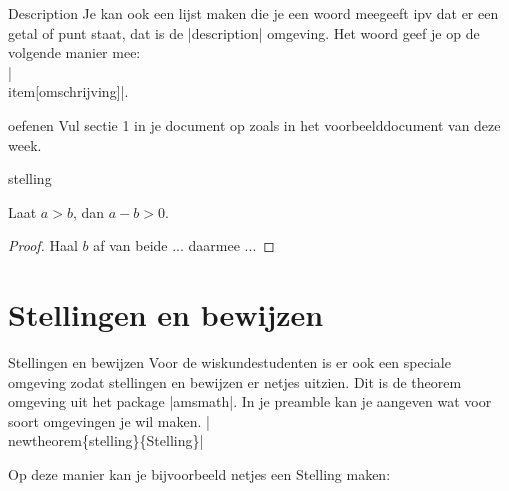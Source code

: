 \documentclass{cursuspresentatie}
\begin{document}
\begin{frame}{Description}
	Je kan ook een lijst maken die je een woord meegeeft ipv dat er een getal of
	punt staat, dat is de \hll|description| omgeving. Het woord geef je op de
	volgende manier mee:\\
	\hll|\\item[omschrijving]|.
\end{frame}

\begin{frame}{oefenen}
	Vul sectie 1 in je document op zoals in het voorbeelddocument van deze week.
\end{frame}

\begin{saveblock}{stelling}
    \begin{highlightblock}
        \begin{stelling}
            Laat $ a > b $, dan $ a - b > 0 $.
            \begin{proof}
                Haal $ b $ af van beide ...
                daarmee ...
            \end{proof}
        \end{stelling}
    \end{highlightblock}
\end{saveblock}

\section{Stellingen en bewijzen}
\begin{frame}[allowframebreaks]{Stellingen en bewijzen}
	Voor de wiskundestudenten is er ook een speciale omgeving zodat stellingen en bewijzen er netjes uitzien.
	Dit is de theorem omgeving uit het package \hll|amsmath|.
	In je preamble kan je aangeven wat voor soort omgevingen je wil maken.
    \hll|\\newtheorem\{stelling\}\{Stelling\}|
	
	\framebreak
	Op deze manier kan je bijvoorbeeld netjes een Stelling maken:
\end{frame}
\end{document}
